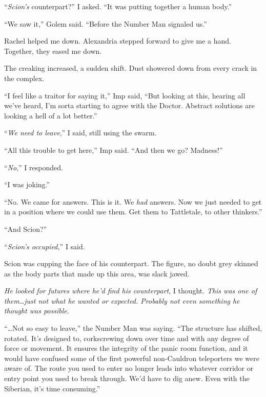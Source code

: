 ``\emph{Scion's} counterpart?'' I asked.  ``It was putting together a human body.''



``We saw it,'' Golem said.  ``Before the Number Man signaled us.''



Rachel helped me down.  Alexandria stepped forward to give me a hand.  Together, they eased me down.



The creaking increased, a sudden shift.  Dust showered down from every crack in the complex.



``I feel like a traitor for saying it,'' Imp said, ``But looking at this, hearing all we've heard, I'm sorta starting to agree with the Doctor.  Abstract solutions are looking a hell of a lot better.''



``\emph{We need to leave},'' I said, still using the swarm.



``All this trouble to get here,'' Imp said.  ``And then we go?  Madness!''



``\emph{No},'' I responded.



``I was joking.''



``No.  We came for answers.  This is it.  We \emph{had} answers.  Now we just needed to get in a position where we could use them.  Get them to Tattletale, to other thinkers.''



``And Scion?''



``\emph{Scion's occupied,}'' I said.



Scion was cupping the face of his counterpart.  The figure, no doubt grey skinned as the body parts that made up this area, was slack jawed.



\emph{He looked for futures where he'd find his counterpart}, I thought.  \emph{This was one of them\ldots just not what he wanted or expected.  Probably not even something he thought was possible}.



``\ldots{}Not so easy to leave,'' the Number Man was saying.  ``The structure has shifted, rotated.  It's designed to, corkscrewing down over time and with any degree of force or movement.  It ensures the integrity of the panic room function, and it would have confused some of the first powerful non-Cauldron teleporters we were aware of.  The route you used to enter no longer leads into whatever corridor or entry point you used to break through.  We'd have to dig anew.  Even with the Siberian, it's time consuming.''




